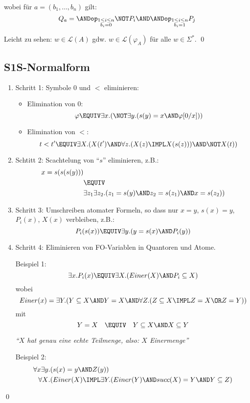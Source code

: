 wobei für $a=(b_1,\dots,b_n)$ gilt:
\[
  Q_a = \ANDop_{\substack{1\leq i\leq n\\ b_i=0}} \NOT P_i \AND \ANDop_{\substack{1\leq i\leq n\\ b_i=1}} P_j
\]

Leicht zu sehen: $w\in\mathcal{L}(A)$ gdw. $w\in\mathcal{L}(\varphi_A)$ für alle $w\in\Sigma^*$.
\qed

\subsection{S1S-Normalform}

\begin{enumerate}
  \item Schritt 1: Symbole $0$ und $<$ eliminieren:
  \begin{itemize}
    \item Elimination von $0$:
    \[
      \varphi \EQUIV \exists x.(\NOT\exists y.(s(y)=x \AND \varphi[0/x]))
    \]
    \item Elimination von $<$:
    \[
      t<t' \EQUIV \exists X.(X(t') \AND \forall z.(X(z)\IMPL X(s(z))) \AND \NOT X(t))
    \]
  \end{itemize}
  \item Schtitt 2: Scachtelung von \enquote{$s$} eliminieren, z.B.:
  \begin{align*}
    x = s(s(s(y))) &\\
      & \EQUIV \\
      & \exists z_1\exists z_2.(z_1=s(y) \AND z_2=s(z_1) \AND x=s(z_2))
  \end{align*}
  \item Schritt 3: Umschreiben atomater Formeln, so dass nur $x=y$,
  $s(x)=y$, $P_i(x)$, $X(x)$ verbleiben, z.B.:
  \[
    P_i(s(x)) \EQUIV \exists y.(y=s(x) \AND P_i(y))
  \]
  \item Schritt 4: Eliminieren von FO-Variablen in Quantoren und Atome.
  
  Beispiel 1:
  \[
    \exists x.P_i(x) \EQUIV \exists X.(Einer(X) \AND P_i\subseteq X)
  \]
  wobei
  \[
    Einer(x) = \exists Y.(Y\subseteq X \AND Y=X \AND \forall Z.(Z\subseteq X \IMPL Z=X \OR Z=Y))
  \]
  mit
  \[
    Y=X \quad \EQUIV \quad Y\subseteq X \AND X\subseteq Y
  \]
  
  \strut\hfill\textit{\enquote{$X$ hat genau eine echte Teilmenge, also: $X$ Einermenge}}
  
  Beispiel 2:
  \begin{align*}
    \forall x\exists y&.(s(x)=y\AND Z(y)) \\
    \forall X&.(Einer(X)\IMPL \exists Y.(Einer(Y) \AND succ(X) = Y \AND Y\subseteq Z)
  \end{align*}
\end{enumerate}
\qed

